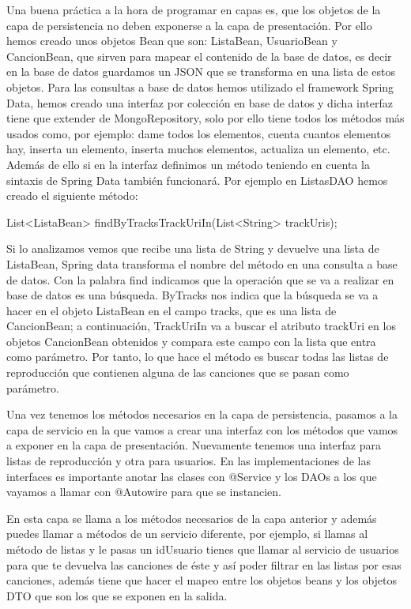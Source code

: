 \documentclass[12pt]{report} %
\begin{document}
Una buena práctica a la hora de programar en capas es, que los objetos de la capa de persistencia no deben exponerse a la capa de presentación. Por ello hemos creado unos objetos Bean que son: ListaBean, UsuarioBean y CancionBean, que sirven para mapear el contenido de la base de datos, es decir en la base de datos guardamos un JSON que se transforma en una lista de estos objetos.
Para las consultas a base de datos hemos utilizado el framework Spring Data, hemos creado una interfaz por colección en base de datos y dicha interfaz tiene que extender de MongoRepository, solo por ello tiene todos los métodos más usados como, por ejemplo: dame todos los elementos, cuenta cuantos elementos hay, inserta un elemento, inserta muchos elementos, actualiza un elemento, etc. Además de ello si en la interfaz definimos un método teniendo en cuenta la sintaxis de Spring Data también funcionará. Por ejemplo en ListasDAO hemos creado el siguiente método:

List<ListaBean> findByTracksTrackUriIn(List<String> trackUris);

Si lo analizamos vemos que recibe una lista de String y devuelve una lista de ListaBean, Spring data transforma el nombre del método en una consulta a base de datos. Con la palabra find indicamos que la operación que se va a realizar en base de datos es una búsqueda. ByTracks nos indica que la búsqueda se va a hacer en el objeto ListaBean  en el campo tracks, que es una lista de CancionBean; a continuación, TrackUriIn va a buscar el atributo trackUri en los objetos CancionBean obtenidos y compara este campo con la lista que entra como parámetro. Por tanto, lo que hace el método es buscar todas las listas de reproducción que contienen alguna de las canciones que se pasan como parámetro.

Una vez tenemos los métodos necesarios en la capa de persistencia, pasamos a la capa de servicio en la que vamos a crear una interfaz con los métodos que vamos a exponer en la capa de presentación. Nuevamente tenemos una interfaz para listas de reproducción y otra para usuarios. En las implementaciones de las interfaces es importante anotar las clases con @Service y los DAOs a los que vayamos a llamar con @Autowire para que se instancien.

En esta capa se llama a los métodos necesarios de la capa anterior y además puedes llamar a métodos de un servicio diferente, por ejemplo, si llamas al método de listas y le pasas un idUsuario tienes que llamar al servicio de usuarios para que te devuelva las canciones de éste y así poder filtrar en las listas por esas canciones, además tiene que hacer el mapeo entre los objetos beans y los objetos DTO que son los que se exponen en la salida.
\end{document}
